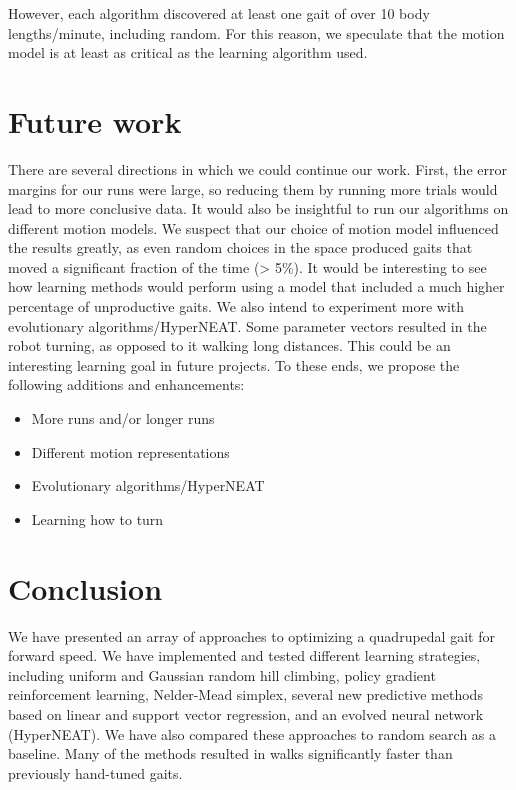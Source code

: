 However, each algorithm discovered at least one gait of over 10 body
lengths/minute, including random. For this reason, we speculate that
the motion model is at least as critical as the learning algorithm
used.



\section{Future work}

There are several directions in which we could continue our
work. First, the error margins for our runs were large, so reducing
them by running more trials would lead to more conclusive data. It
would also be insightful to run our algorithms on different motion
models.  We suspect that our choice of motion model influenced the
results greatly, as even random choices in the space produced gaits
that moved a significant fraction of the time (> 5\%).  It would be
interesting to see how learning methods would perform using a model
that included a much higher percentage of unproductive gaits. We also
intend to experiment more with evolutionary algorithms/HyperNEAT.
Some parameter vectors resulted in the robot turning, as opposed to it
walking long distances. This could be an interesting learning goal in
future projects. To these ends, we propose the following additions and
enhancements:

\begin{itemize}
\item More runs and/or longer runs
\item Different motion representations
\item Evolutionary algorithms/HyperNEAT\cite{clune}
\item Learning how to turn
\end{itemize}



\section{Conclusion}


We have presented an array of approaches to optimizing a quadrupedal
gait for forward speed.  We have implemented and tested different
learning strategies, including uniform and Gaussian random hill
climbing, policy gradient reinforcement learning, Nelder-Mead simplex,
several new predictive methods based on linear and support vector
regression, and an evolved neural network (HyperNEAT).  We have also
compared these approaches to random search as a baseline. Many of the
methods resulted in walks significantly faster than previously
hand-tuned gaits.

